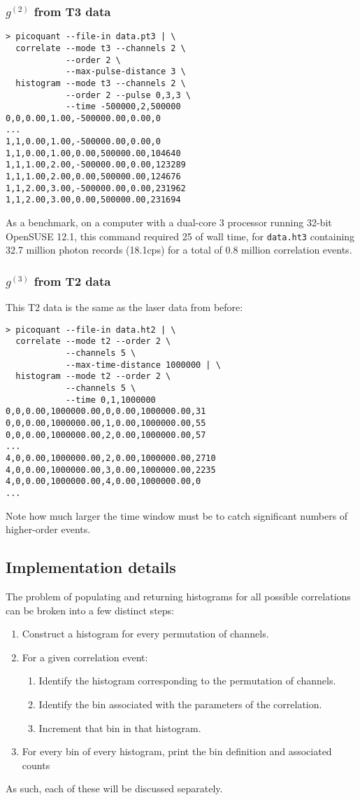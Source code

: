 \documentclass{article}
\newcommand{\cps}{\textnormal{cps}}
\newcommand{\gn}[1]{\ensuremath{g^{(#1)}}}
\begin{document}
\subsubsection{\gn{2} from T3 data}
\begin{verbatim}
> picoquant --file-in data.pt3 | \
  correlate --mode t3 --channels 2 \
            --order 2 \
            --max-pulse-distance 3 \
  histogram --mode t3 --channels 2 \
            --order 2 --pulse 0,3,3 \
            --time -500000,2,500000
0,0,0.00,1.00,-500000.00,0.00,0
...
1,1,0.00,1.00,-500000.00,0.00,0
1,1,0.00,1.00,0.00,500000.00,104640
1,1,1.00,2.00,-500000.00,0.00,123289
1,1,1.00,2.00,0.00,500000.00,124676
1,1,2.00,3.00,-500000.00,0.00,231962
1,1,2.00,3.00,0.00,500000.00,231694
\end{verbatim}
As a benchmark, on a computer with a dual-core 3\giga\hertz{} processor running 32-bit OpenSUSE 12.1, this command required 25\second{} of wall time, for \texttt{data.ht3} containing 32.7 million photon records (18.1\kilo\cps) for a total of 0.8 million correlation events.

\subsubsection{\gn{3} from T2 data}
This T2 data is the same as the laser data from before:
\begin{verbatim}
> picoquant --file-in data.ht2 | \
  correlate --mode t2 --order 2 \
            --channels 5 \
            --max-time-distance 1000000 | \
  histogram --mode t2 --order 2 \
            --channels 5 \
            --time 0,1,1000000
0,0,0.00,1000000.00,0,0.00,1000000.00,31
0,0,0.00,1000000.00,1,0.00,1000000.00,55
0,0,0.00,1000000.00,2,0.00,1000000.00,57
...
4,0,0.00,1000000.00,2,0.00,1000000.00,2710
4,0,0.00,1000000.00,3,0.00,1000000.00,2235
4,0,0.00,1000000.00,4,0.00,1000000.00,0
...
\end{verbatim}
Note how much larger the time window must be to catch significant numbers of higher-order events.

\subsection{Implementation details}
The problem of populating and returning histograms for all possible correlations can be broken into a few distinct steps:
\begin{enumerate}
\item Construct a histogram for every permutation of channels.
\item For a given correlation event:
  \begin{enumerate}
  \item Identify the histogram corresponding to the permutation of channels.
  \item Identify the bin associated with the parameters of the correlation.
  \item Increment that bin in that histogram.
  \end{enumerate}
\item For every bin of every histogram, print the bin definition and associated counts
\end{enumerate}
As such, each of these will be discussed separately.
\end{document}
